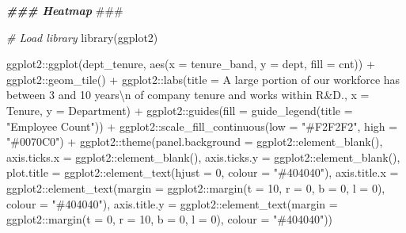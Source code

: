 \documentclass[
]{book}
\newenvironment{Shaded}{\begin{snugshade}}{\end{snugshade}}
\newcommand{\AlertTok}[1]{\textcolor[rgb]{0.94,0.16,0.16}{#1}}
\newcommand{\AttributeTok}[1]{\textcolor[rgb]{0.77,0.63,0.00}{#1}}
\newcommand{\CommentTok}[1]{\textcolor[rgb]{0.56,0.35,0.01}{\textit{#1}}}
\newcommand{\DecValTok}[1]{\textcolor[rgb]{0.00,0.00,0.81}{#1}}
\newcommand{\DocumentationTok}[1]{\textcolor[rgb]{0.56,0.35,0.01}{\textbf{\textit{#1}}}}
\newcommand{\FunctionTok}[1]{\textcolor[rgb]{0.00,0.00,0.00}{#1}}
\newcommand{\NormalTok}[1]{#1}
\newcommand{\SpecialCharTok}[1]{\textcolor[rgb]{0.00,0.00,0.00}{#1}}
\newcommand{\StringTok}[1]{\textcolor[rgb]{0.31,0.60,0.02}{#1}}
\begin{document}
\begin{Shaded}
\begin{Highlighting}[]
\DocumentationTok{\#\#\# Heatmap }\AlertTok{\#\#\#}

\CommentTok{\# Load library}
\FunctionTok{library}\NormalTok{(ggplot2)}

\NormalTok{ggplot2}\SpecialCharTok{::}\FunctionTok{ggplot}\NormalTok{(dept\_tenure, }\FunctionTok{aes}\NormalTok{(}\AttributeTok{x =}\NormalTok{ tenure\_band, }\AttributeTok{y =}\NormalTok{ dept, }\AttributeTok{fill =}\NormalTok{ cnt)) }\SpecialCharTok{+}
\NormalTok{ggplot2}\SpecialCharTok{::}\FunctionTok{geom\_tile}\NormalTok{() }\SpecialCharTok{+}
\NormalTok{ggplot2}\SpecialCharTok{::}\FunctionTok{labs}\NormalTok{(}\AttributeTok{title =} \StringTok{\textquotesingle{}A large portion of our workforce has between 3 and 10 years}\SpecialCharTok{\textbackslash{}n}\StringTok{ of company tenure and works within R\&D.\textquotesingle{}}\NormalTok{, }\AttributeTok{x =} \StringTok{\textquotesingle{}Tenure\textquotesingle{}}\NormalTok{, }\AttributeTok{y =} \StringTok{\textquotesingle{}Department\textquotesingle{}}\NormalTok{) }\SpecialCharTok{+}
\NormalTok{ggplot2}\SpecialCharTok{::}\FunctionTok{guides}\NormalTok{(}\AttributeTok{fill =} \FunctionTok{guide\_legend}\NormalTok{(}\AttributeTok{title =} \StringTok{"Employee Count"}\NormalTok{)) }\SpecialCharTok{+}
\NormalTok{ggplot2}\SpecialCharTok{::}\FunctionTok{scale\_fill\_continuous}\NormalTok{(}\AttributeTok{low =} \StringTok{"\#F2F2F2"}\NormalTok{, }\AttributeTok{high =} \StringTok{"\#0070C0"}\NormalTok{) }\SpecialCharTok{+}
\NormalTok{ggplot2}\SpecialCharTok{::}\FunctionTok{theme}\NormalTok{(}\AttributeTok{panel.background =}\NormalTok{ ggplot2}\SpecialCharTok{::}\FunctionTok{element\_blank}\NormalTok{(),}
               \AttributeTok{axis.ticks.x =}\NormalTok{ ggplot2}\SpecialCharTok{::}\FunctionTok{element\_blank}\NormalTok{(),}
               \AttributeTok{axis.ticks.y =}\NormalTok{ ggplot2}\SpecialCharTok{::}\FunctionTok{element\_blank}\NormalTok{(),}
               \AttributeTok{plot.title =}\NormalTok{ ggplot2}\SpecialCharTok{::}\FunctionTok{element\_text}\NormalTok{(}\AttributeTok{hjust =} \DecValTok{0}\NormalTok{, }\AttributeTok{colour =} \StringTok{"\#404040"}\NormalTok{),}
               \AttributeTok{axis.title.x =}\NormalTok{ ggplot2}\SpecialCharTok{::}\FunctionTok{element\_text}\NormalTok{(}\AttributeTok{margin =}\NormalTok{ ggplot2}\SpecialCharTok{::}\FunctionTok{margin}\NormalTok{(}\AttributeTok{t =} \DecValTok{10}\NormalTok{, }\AttributeTok{r =} \DecValTok{0}\NormalTok{, }\AttributeTok{b =} \DecValTok{0}\NormalTok{, }\AttributeTok{l =} \DecValTok{0}\NormalTok{), }\AttributeTok{colour =} \StringTok{"\#404040"}\NormalTok{),}
               \AttributeTok{axis.title.y =}\NormalTok{ ggplot2}\SpecialCharTok{::}\FunctionTok{element\_text}\NormalTok{(}\AttributeTok{margin =}\NormalTok{ ggplot2}\SpecialCharTok{::}\FunctionTok{margin}\NormalTok{(}\AttributeTok{t =} \DecValTok{0}\NormalTok{, }\AttributeTok{r =} \DecValTok{10}\NormalTok{, }\AttributeTok{b =} \DecValTok{0}\NormalTok{, }\AttributeTok{l =} \DecValTok{0}\NormalTok{), }\AttributeTok{colour =} \StringTok{"\#404040"}\NormalTok{))}
\end{Highlighting}
\end{Shaded}
\end{document}
